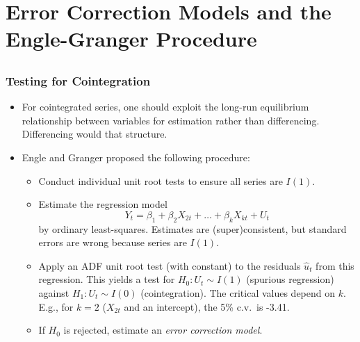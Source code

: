 \section[ECM and Engle-Granger]{Error Correction Models and the Engle-Granger Procedure}\subsection*{}
\begin{frame}%

\frametitle{Testing for Cointegration}
\begin{itemize}
\item For cointegrated series, one should exploit the long-run equilibrium relationship between variables for estimation rather than differencing. Differencing would  that structure.
\item Engle and Granger proposed the following procedure:

\begin{itemize}
\item Conduct individual unit root tests to ensure all series are $I(1)$.
\item Estimate the regression model%
\begin{equation*}
Y_{t}=\beta _{1}+\beta _{2}X_{2t}+\ldots +\beta _{k}X_{kt}+U_{t}
\end{equation*}%
by ordinary least-squares. Estimates are (super)consistent, but standard errors are wrong because series are $I(1)$.

\item Apply an ADF unit root test (with constant) to the residuals $\hat{u}_{t}$ from this
regression. This yields a test for $H_{0}:U_{t}\sim I(1)$ (spurious
regression) against $H_{1}:U_{t}\sim I(0)$ (cointegration). The critical
values depend on $k$. E.g., for $k=2$ ($X_{2t}$ and an intercept),
the 5\% c.v.\ is -3.41.

\item If $H_{0}$ is rejected, estimate an \emph{\color{red}error correction
model}.
\end{itemize}
\end{itemize}
\end{frame}%

